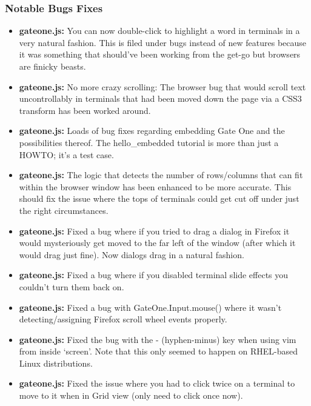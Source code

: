 \documentclass[letterpaper,10pt,openany]{sphinxmanual}
\begin{document}
\subsubsection{Notable Bugs Fixes}
\label{ReleaseNotes/index:notable-bugs-fixes}\begin{itemize}
\item {} 
\textbf{gateone.js:}  You can now double-click to highlight a word in terminals in a very natural fashion.  This is filed under bugs instead of new features because it was something that should've been working from the get-go but browsers are finicky beasts.

\item {} 
\textbf{gateone.js:}  No more crazy scrolling:  The browser bug that would scroll text uncontrollably in terminals that had been moved down the page via a CSS3 transform has been worked around.

\item {} 
\textbf{gateone.js:}  Loads of bug fixes regarding embedding Gate One and the possibilities thereof.  The hello\_embedded tutorial is more than just a HOWTO; it's a test case.

\item {} 
\textbf{gateone.js:}  The logic that detects the number of rows/columns that can fit within the browser window has been enhanced to be more accurate.  This should fix the issue where the tops of terminals could get cut off under just the right circumstances.

\item {} 
\textbf{gateone.js:}  Fixed a bug where if you tried to drag a dialog in Firefox it would mysteriously get moved to the far left of the window (after which it would drag just fine).  Now dialogs drag in a natural fashion.

\item {} 
\textbf{gateone.js:}  Fixed a bug where if you disabled terminal slide effects you couldn't turn them back on.

\item {} 
\textbf{gateone.js:}  Fixed a bug with GateOne.Input.mouse() where it wasn't detecting/assigning Firefox scroll wheel events properly.

\item {} 
\textbf{gateone.js:}  Fixed the bug with the - (hyphen-minus) key when using vim from inside `screen'.  Note that this only seemed to happen on RHEL-based Linux distributions.

\item {} 
\textbf{gateone.js:}  Fixed the issue where you had to click twice on a terminal to move to it when in Grid view (only need to click once now).


\end{itemize}
\end{document}
